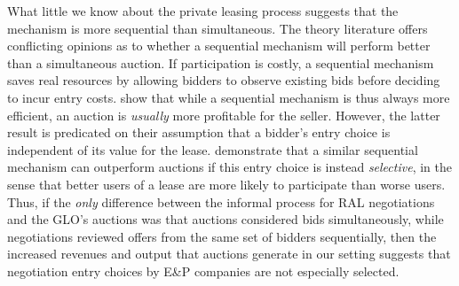 \documentclass[12pt]{article}
\begin{document}
What little we know about the private leasing process suggests that the mechanism is more sequential than simultaneous. The theory literature offers conflicting opinions as to whether a sequential mechanism will perform better than a simultaneous auction. If participation is costly, a sequential mechanism saves real resources by allowing bidders to observe existing bids before deciding to incur entry costs. \cite{bulow_why_2009} show that while a sequential mechanism is thus always more efficient, an auction is \emph{usually} more profitable for the seller. However, the latter result is predicated on their assumption that a bidder's entry choice is independent of its value for the lease.  \citet{roberts_when_2013} demonstrate that a similar sequential mechanism can outperform auctions if this entry choice is instead \emph{selective}, in the sense that better users of a lease are more likely to participate than worse users. Thus, if the \textit{only} difference between the informal process for RAL negotiations and the GLO's auctions was that auctions considered bids simultaneously, while negotiations reviewed offers from the same set of bidders sequentially, then the increased revenues and output that auctions generate in our setting suggests that negotiation entry choices by E\&P companies are not especially selected.
\end{document}
